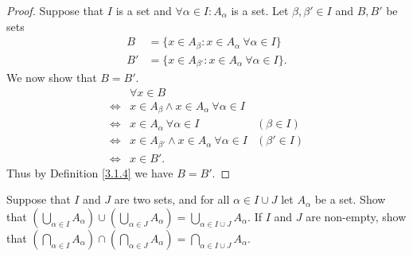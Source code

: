 \begin{proof}
    Suppose that \(I\) is a set and \(\forall \alpha \in I : A_{\alpha}\) is a set.
    Let \(\beta, \beta' \in I\) and \(B, B'\) be sets
    \begin{align*}
        B  & = \{x \in A_{\beta} : x \in A_{\alpha} \ \forall \alpha \in I\}   \\
        B' & = \{x \in A_{\beta'} : x \in A_{\alpha} \ \forall \alpha \in I\}.
    \end{align*}
    We now show that \(B = B'\).
    \begin{align*}
             & \forall x \in B                                                                 \\
        \iff & x \in A_{\beta} \land x \in A_{\alpha} \ \forall \alpha \in I                   \\
        \iff & x \in A_{\alpha} \ \forall \alpha \in I                        & (\beta \in I)  \\
        \iff & x \in A_{\beta'} \land x \in A_{\alpha} \ \forall \alpha \in I & (\beta' \in I) \\
        \iff & x \in B'.
    \end{align*}
    Thus by Definition \ref{3.1.4} we have \(B = B'\).
\end{proof}

\begin{exercise}\label{ex 3.4.10}
    Suppose that \(I\) and \(J\) are two sets, and for all \(\alpha \in I \cup J\) let \(A_{\alpha}\) be a set.
    Show that \((\bigcup_{\alpha \in I} A_{\alpha}) \cup (\bigcup_{\alpha \in J} A_{\alpha}) = \bigcup_{\alpha \in I \cup J} A_{\alpha}\).
    If \(I\) and \(J\) are non-empty, show that \((\bigcap_{\alpha \in I} A_{\alpha}) \cap (\bigcap_{\alpha \in J} A_{\alpha}) = \bigcap_{\alpha \in I \cup J} A_{\alpha}\).
\end{exercise}

